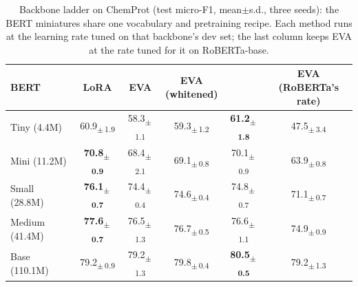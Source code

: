 \begin{table}[t]
\centering
\caption{Backbone ladder on ChemProt (test micro-F1, mean$\pm$s.d., three seeds): the BERT miniatures share one vocabulary and pretraining recipe. Each method runs at the learning rate tuned on that backbone's dev set; the last column keeps EVA at the rate tuned for it on RoBERTa-base.}
\label{tab:ladder}
\footnotesize
\setlength{\tabcolsep}{1.4pt}
\begin{tabular}{lccccc}
\toprule
BERT & LoRA & EVA & \shortstack{EVA\\(whitened)} & \method{} & \shortstack{EVA\\(RoBERTa's rate)} \\
\midrule
Tiny (4.4M) & 60.9\textsubscript{$\pm$\,1.9} & 58.3\textsubscript{$\pm$\,1.1} & 59.3\textsubscript{$\pm$\,1.2} & \textbf{61.2\textsubscript{$\pm$\,1.8}} & 47.5\textsubscript{$\pm$\,3.4} \\
Mini (11.2M) & \textbf{70.8\textsubscript{$\pm$\,0.9}} & 68.4\textsubscript{$\pm$\,2.1} & 69.1\textsubscript{$\pm$\,0.8} & 70.1\textsubscript{$\pm$\,0.9} & 63.9\textsubscript{$\pm$\,0.8} \\
Small (28.8M) & \textbf{76.1\textsubscript{$\pm$\,0.7}} & 74.4\textsubscript{$\pm$\,0.4} & 74.6\textsubscript{$\pm$\,0.4} & 74.8\textsubscript{$\pm$\,0.7} & 71.1\textsubscript{$\pm$\,0.7} \\
Medium (41.4M) & \textbf{77.6\textsubscript{$\pm$\,0.7}} & 76.5\textsubscript{$\pm$\,1.3} & 76.7\textsubscript{$\pm$\,0.5} & 76.6\textsubscript{$\pm$\,1.1} & 74.9\textsubscript{$\pm$\,0.9} \\
Base (110.1M) & 79.2\textsubscript{$\pm$\,0.9} & 79.2\textsubscript{$\pm$\,1.3} & 79.8\textsubscript{$\pm$\,0.4} & \textbf{80.5\textsubscript{$\pm$\,0.5}} & 79.2\textsubscript{$\pm$\,1.3} \\
\bottomrule
\end{tabular}
\end{table}
